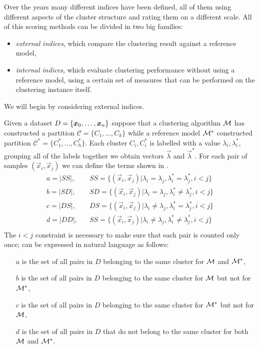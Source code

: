 \medskip

Over the years many different indices have been defined, all of them using different aspects of the
cluster structure and rating them on a different scale. All of this scoring methods can be divided
in two big families:
\begin{itemize}
	\item \emph{external indices}, which compare the clustering result against a reference model,
	\item \emph{internal indices}, which evaluate clustering performance without using a
		reference model, using a certain set of measures that can be performed on the
		clustering instance itself.
\end{itemize}
We will begin by considering external indices.

Given a dataset $D = \{\boldsymbol{x}_0, \ldots, \boldsymbol{x}_n\}$ suppose that a clustering algorithm $\mathcal{M}$ has constructed a partition
$\mathcal{C} = \{C_1, \ldots, C_k\}$ while a reference model $\mathcal{M}^*$ constructed partition
$\mathcal{C}^*=\{C^*_1, \ldots, C^*_h\}$. Each cluster $C_i, C^*_i$ is labelled with a value
$\lambda_i, \lambda^*_i$, grouping all of the labels together we obtain vectors $\vec{\lambda}$ and
$\vec{\lambda}^*$. For each pair of samples $(\vec{x}_i, \vec{x}_j)$ we can define the terms shown in
.
\begin{equation}
	\label{eq:clustering-terms}
	\begin{aligned}
		a =|SS|, \hspace{10pt} &SS = \{(\vec{x}_i, \vec{x}_j) | \lambda_i = \lambda_j, \lambda^*_i =
		\lambda^*_j, i < j\} \\
		b =|SD|, \hspace{10pt} &SD = \{(\vec{x}_i, \vec{x}_j) | \lambda_i = \lambda_j, \lambda^*_i
		\neq \lambda^*_j, i < j\} \\
		c =|DS|, \hspace{10pt} &DS = \{(\vec{x}_i, \vec{x}_j) | \lambda_i \neq \lambda_j, \lambda^*_i =
		\lambda^*_j, i < j\} \\
		d =|DD|, \hspace{10pt} &SS = \{(\vec{x}_i, \vec{x}_j) | \lambda_i \neq \lambda_j,
		\lambda^*_i \neq \lambda^*_j, i < j\} \\
	\end{aligned}
\end{equation}
The $i < j$ constraint is necessary to make sure that each pair is counted only once;  can be expressed in natural language as follows:
\begin{itemize}
	\item[$a$] is the set of all pairs in $D$ belonging to the same cluster for $\mathcal{M}$ and
		$\mathcal{M}^*$,
	\item[$b$] is the set of all pairs in $D$ belonging to the same cluster for $\mathcal{M}$ but not
		for $\mathcal{M}^*$,
	\item[$c$] is the set of all pairs in $D$ belonging to the same cluster for $\mathcal{M}^*$ but
		not for $\mathcal{M}$,
	\item[$d$] is the set of all pairs in $D$ that do not belong to the same cluster for both
		$\mathcal{M}$ and $\mathcal{M}^*$.
\end{itemize}
